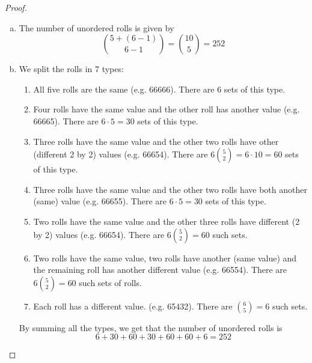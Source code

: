 \vspace{1em}

\begin{proof}
    \hfill
    \begin{enumerate}[(a)]
        \item The number of unordered rolls is given by 
            \[
                \binom{5 + (6 - 1)}{6 - 1} = \binom{10}{5} = 252
            \] 

        \item We split the rolls in 7 types:
            \begin{enumerate}[(1)]
                \item All five rolls are the same (e.g. 66666). There are 6 sets of this type.

                \item Four rolls have the same value and the other roll has another value (e.g. 66665).
                    There are $6 \cdot 5 = 30$ sets of this type.
                
                \item Three rolls have the same value and the other two rolls have other (different 2 by 2)
                    values (e.g. 66654). There are  $6 \binom{5}{2} = 6 \cdot 10 = 60$ sets of this type.

                \item Three rolls have the same value and the other two rolls have both another (same) value 
                    (e.g. 66655). There are $6 \cdot 5 = 30$ sets of this type.

                \item Two rolls have the same value and the other three rolls have different (2 by 2) values
                    (e.g. 66654). There are $6 \binom{5}{2} = 60$ such sets.

                \item Two rolls have the same value, two rolls have another (same value) and the 
                    remaining roll has another different value (e.g. 66554). 
                    There are $6 \binom{5}{2} = 60$ such sets of rolls.

                \item Each roll has a different value. (e.g. 65432). There are $\binom{6}{5} = 6$ such sets.
            \end{enumerate}

        By summing all the types, we get that the number of unordered rolls is 
        \[
            6 + 30 + 60 + 30 + 60 + 60 + 6 = 252
        \] 


\end{enumerate}
\end{proof}

